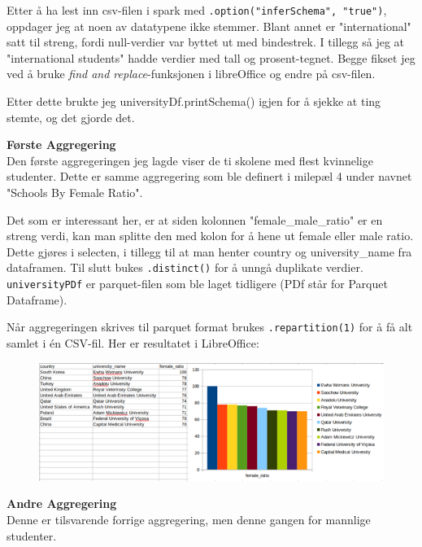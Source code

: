 Etter å ha lest inn csv-filen i spark med \lstinline{.option("inferSchema", "true")}, oppdager jeg at noen av datatypene ikke stemmer. Blant annet er "international" satt til streng, fordi null-verdier var byttet ut med bindestrek. I tillegg så jeg at "international students" hadde verdier med tall og prosent-tegnet. Begge fikset jeg ved å bruke \textit{find and replace}-funksjonen i libreOffice og endre på csv-filen.

Etter dette brukte jeg universityDf.printSchema() igjen for å sjekke at ting stemte, og det gjorde det.

\textbf{Første Aggregering}\\
Den første aggregeringen jeg lagde viser de ti skolene med flest kvinnelige studenter. Dette er samme aggregering som ble definert i milepæl 4 under navnet "Schools By Female Ratio".


Det som er interessant her, er at siden kolonnen "female\_male\_ratio" er en streng verdi, kan man splitte den med kolon for å hene ut female eller male ratio. Dette gjøres i selecten, i tillegg til at man henter country og university\_name fra dataframen. Til slutt bukes \lstinline{.distinct()} for å unngå duplikate verdier. \lstinline{universityPDf} er parquet-filen som ble laget tidligere (PDf står for Parquet Dataframe).

Når aggregeringen skrives til parquet format brukes \lstinline{.repartition(1)} for å få alt samlet i én CSV-fil. Her er resultatet i LibreOffice:

\FigureCounter
\begin{figure}[H]
    \includegraphics[width=\textwidth]{images/milepael5/resUniFemRatio.png}
\end{figure}

\textbf{Andre Aggregering}\\
Denne er tilsvarende forrige aggregering, men denne gangen for mannlige studenter.


